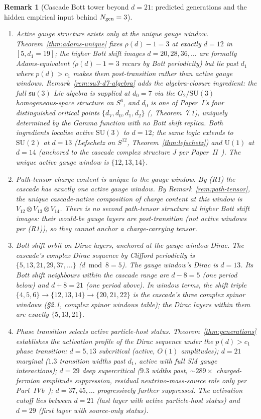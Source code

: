\documentclass[12pt,a4paper]{article}
\newtheorem{remark}[theorem]{Remark}
\begin{document}
\begin{remark}[Cascade Bott tower beyond $d=21$: predicted generations and the hidden empirical input behind $N_{\rm gen}=3$]
\begin{enumerate}[label=(R\arabic*),nosep]
\item \emph{Active gauge structure exists only at the unique gauge window.} Theorem~\ref{thm:adams-unique} fixes $\rho(d)-1=3$ at exactly $d=12$ in $[5,d_1=19]$; the higher Bott shift images $d=20, 28, 36, \ldots$ are formally Adams-equivalent ($\rho(d)-1=3$ recurs by Bott periodicity) but lie past $d_1$ where $p(d) > c_1$ makes them post-transition rather than active gauge windows. Remark~\ref{rem:su3-d7-algebra} adds the algebra-closure ingredient: the full $\mathfrak{su}(3)$ Lie algebra is supplied at $d_0=7$ via the $G_2/\mathrm{SU}(3)$ homogeneous-space structure on $S^6$, and $d_0$ is one of Paper~I's four distinguished critical points $\{d_V,d_0,d_1,d_2\}$ (\cite{part0}, Theorem~7.1), uniquely determined by the Gamma function with no Bott shift replica. Both ingredients localise active $\mathrm{SU}(3)$ to $d=12$; the same logic extends to $\mathrm{SU}(2)$ at $d=13$ (Lefschetz on $S^{12}$, Theorem~\ref{thm:lefschetz}) and $\mathrm{U}(1)$ at $d=14$ (anchored to the cascade complex structure $J$ per Paper~II~\cite{part2}). The unique active gauge window is $\{12,13,14\}$.
\item \emph{Path-tensor charge content is unique to the gauge window.} By (R1) the cascade has exactly one active gauge window. By Remark~\ref{rem:path-tensor}, the unique cascade-native composition of charge content at this window is $V_{12}\otimes V_{13}\otimes V_{14}$. There is no second path-tensor structure at higher Bott shift images: their would-be gauge layers are post-transition (not active windows per (R1)), so they cannot anchor a charge-carrying tensor.
\item \emph{Bott shift orbit on Dirac layers, anchored at the gauge-window Dirac.} The cascade's complex Dirac sequence by Clifford periodicity is $\{5, 13, 21, 29, 37, \ldots\}$ ($d \bmod 8 = 5$). The gauge window's Dirac is $d=13$. Its Bott shift neighbours within the cascade range are $d-8=5$ (one period below) and $d+8=21$ (one period above). In window terms, the shift triple $\{4,5,6\} \to \{12,13,14\} \to \{20,21,22\}$ is the cascade's three complex spinor windows (\S2.1, complex spinor windows table); the Dirac layers within them are exactly $\{5, 13, 21\}$.
\item \emph{Phase transition selects active particle-host status.} Theorem~\ref{thm:generations} establishes the activation profile of the Dirac sequence under the $p(d)>c_1$ phase transition: $d=5,13$ subcritical (active, $O(1)$ amplitudes); $d=21$ marginal ($1.3$ transition widths past $d_1$, active with full SM gauge interactions); $d=29$ deep supercritical ($9.3$ widths past, $\sim 289\times$ charged-fermion amplitude suppression, residual neutrino-mass-source role only per Part~IVb~\cite{part4b}); $d=37,45,\ldots$ progressively further suppressed. The activation cutoff lies between $d=21$ (last layer with active particle-host status) and $d=29$ (first layer with source-only status).

\end{enumerate}
\end{remark}
\end{document}
